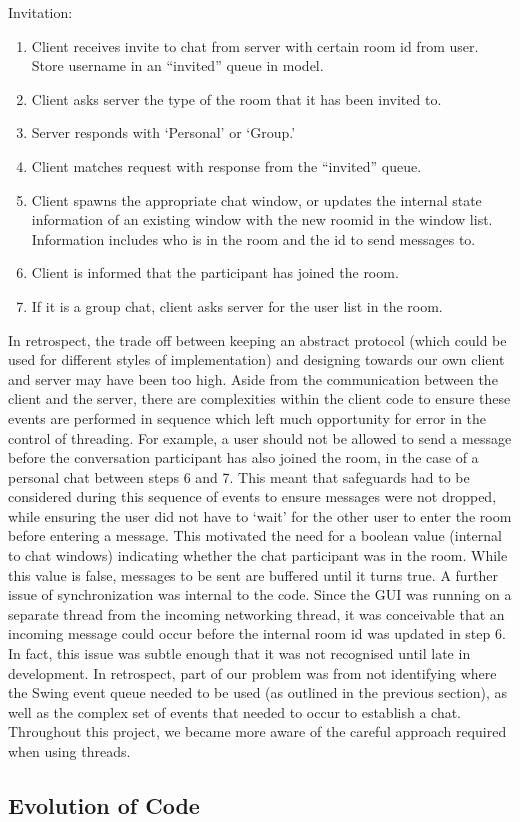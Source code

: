 Invitation:
\begin{enumerate}
\item Client receives invite to chat from server with certain room id from user. Store username in an ``invited'' queue in model.  
\item Client asks server the type of the room that it has been invited to.
\item Server responds with `Personal' or `Group.'
\item Client matches request with response from the ``invited'' queue.
\item Client spawns the appropriate chat window, or updates the internal state information of an existing window with the new roomid in the window list. Information includes who is in the room and the id to send messages to.
\item Client is informed that the participant has joined the room.
\item If it is a group chat, client asks server for the user list in the room.
\end{enumerate}

In retrospect, the trade off between keeping an abstract protocol (which could be used for different styles of implementation) and designing towards our own client and server may have been too high. Aside from the communication between the client and the server, there are complexities within the client code to ensure these events are performed in sequence which left much opportunity for error in the control of threading. For example, a user should not be allowed to send a message before the conversation participant has also joined the room, in the case of a personal chat between steps 6 and 7. This meant that safeguards had to be considered during this sequence of events to ensure messages were not dropped, while ensuring the user did not have to `wait' for the other user to enter the room before entering a message. This motivated the need for a boolean value (internal to chat windows) indicating whether the chat participant was in the room. While this value is false, messages to be sent are buffered until it turns true. A further issue of synchronization was internal to the code. Since the GUI was running on a separate thread from the incoming networking thread, it was conceivable that an incoming message could occur before the internal room id was updated in step 6. In fact, this issue was subtle enough that it was not recognised until late in development. In retrospect, part of our problem was from not identifying where the Swing event queue needed to be used (as outlined in the previous section), as well as the complex set of events that needed to occur to establish a chat. Throughout this project, we became more aware of the careful approach required when using threads.

\subsection{Evolution of Code}


